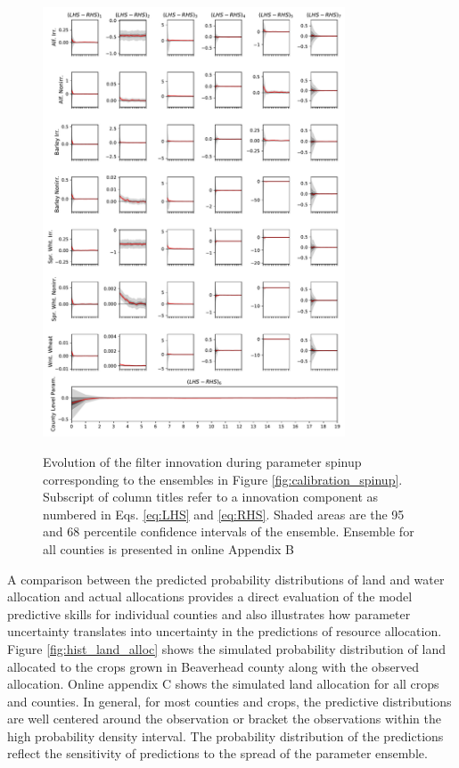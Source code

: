 \begin{figure}
\includegraphics[width=0.8\textwidth]{Figures/inn_spin_Beaverhead.pdf}
\label{fig:innovation_spinup}
\caption{Evolution of the filter innovation during parameter spinup corresponding to the ensembles in Figure \ref{fig:calibration_spinup}. Subscript of column titles refer to a innovation component as numbered in Eqs. \eqref{eq:LHS} and \eqref{eq:RHS}. Shaded areas are the 95 and 68 percentile confidence intervals of the ensemble. Ensemble for all counties is presented in online Appendix B}
\end{figure}

A comparison between the predicted probability distributions of land and water allocation and actual allocations provides a direct evaluation of the model predictive skills for individual counties and also illustrates how parameter uncertainty translates into uncertainty in the predictions of resource allocation. Figure \ref{fig:hist_land_alloc} shows the simulated probability distribution of land allocated to the crops grown in Beaverhead county along with the observed allocation. Online appendix C shows the simulated land allocation for all crops and counties. In general, for most counties and crops, the predictive distributions are well centered around the observation or bracket the observations within the high probability density interval. The probability distribution of the predictions reflect the sensitivity of predictions to the spread of the parameter ensemble.  


